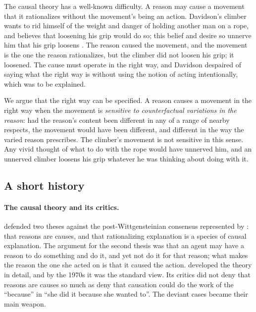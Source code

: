 \documentclass{situationist-preprint}
\begin{document}
The causal theory has a well-known difficulty. A reason may cause a movement that it rationalizes without the movement's being an action. Davidson's climber wants to rid himself of the weight and danger of holding another man on a rope, and believes that loosening his grip would do so; this belief and desire so unnerve him that his grip loosens \citep{Davidson1973}. The reason caused the movement, and the movement is the one the reason rationalizes, but the climber did not loosen his grip; it loosened. The cause must operate in the right way, and Davidson despaired of saying what the right way is without using the notion of acting intentionally, which was to be explained.

We argue that the right way can be specified. A reason causes a movement in the right way when the movement is \emph{sensitive to counterfactual variations in the reason}: had the reason's content been different in any of a range of nearby respects, the movement would have been different, and different in the way the varied reason prescribes. The climber's movement is not sensitive in this sense. Any vivid thought of what to do with the rope would have unnerved him, and an unnerved climber loosens his grip whatever he was thinking about doing with it.

\subsection{A short history}\label{s:history}

\paragraph{The causal theory and its critics.} \citet{Davidson1963} defended two theses against the post-Wittgensteinian consensus represented by \citet{Melden1961}: that reasons are causes, and that rationalizing explanation is a species of causal explanation. The argument for the second thesis was that an agent may have a reason to do something and do it, and yet not do it for that reason; what makes the reason the one she acted on is that it caused the action. \citet{Goldman1970} developed the theory in detail, and by the 1970s it was the standard view. Its critics did not deny that reasons are causes so much as deny that causation could do the work of the \enquote{because} in \enquote{she did it because she wanted to}. The deviant cases became their main weapon.
\end{document}
